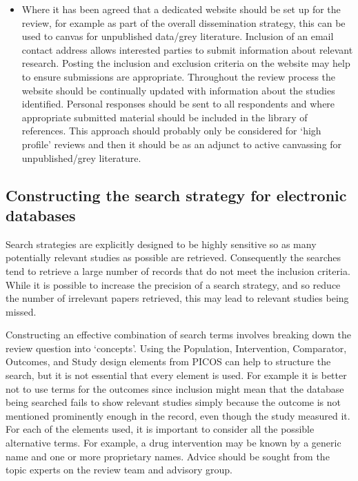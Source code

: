 \documentclass[
  11pt,
  a4paper,
  DIV=11,
  numbers=noendperiod]{scrreprt}
\providecommand{\tightlist}{%
  \setlength{\itemsep}{0pt}\setlength{\parskip}{0pt}}
\begin{document}
\begin{itemize}
  \begin{itemize}
  \tightlist
  \item
    Where it has been agreed that a dedicated website should be set up
    for the review, for example as part of the overall dissemination
    strategy, this can be used to canvas for unpublished data/grey
    literature. Inclusion of an email contact address allows interested
    parties to submit information about relevant research. Posting the
    inclusion and exclusion criteria on the website may help to ensure
    submissions are appropriate. Throughout the review process the
    website should be continually updated with information about the
    studies identified. Personal responses should be sent to all
    respondents and where appropriate submitted material should be
    included in the library of references. This approach should probably
    only be considered for `high profile' reviews and then it should be
    as an adjunct to active canvassing for unpublished/grey literature.
  \end{itemize}
\end{itemize}

\subsection{Constructing the search strategy for electronic
databases}\label{constructing-the-search-strategy-for-electronic-databases}

Search strategies are explicitly designed to be highly sensitive so as
many potentially relevant studies as possible are retrieved.
Consequently the searches tend to retrieve a large number of records
that do not meet the inclusion criteria. While it is possible to
increase the precision of a search strategy, and so reduce the number of
irrelevant papers retrieved, this may lead to relevant studies being
missed.

Constructing an effective combination of search terms involves breaking
down the review question into `concepts'. Using the Population,
Intervention, Comparator, Outcomes, and Study design elements from PICOS
can help to structure the search, but it is not essential that every
element is used. For example it is better not to use terms for the
outcomes since inclusion might mean that the database being searched
fails to show relevant studies simply because the outcome is not
mentioned prominently enough in the record, even though the study
measured it. For each of the elements used, it is important to consider
all the possible alternative terms. For example, a drug intervention may
be known by a generic name and one or more proprietary names. Advice
should be sought from the topic experts on the review team and advisory
group.
\end{document}
